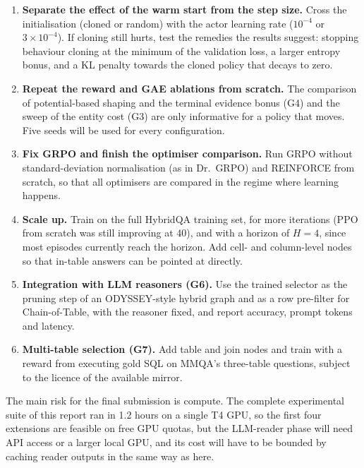 \begin{enumerate}
  \item \textbf{Separate the effect of the warm start from the step size.} Cross the initialisation (cloned or random) with the actor learning rate ($10^{-4}$ or $3\times10^{-4}$). If cloning still hurts, test the remedies the results suggest: stopping behaviour cloning at the minimum of the validation loss, a larger entropy bonus, and a KL penalty towards the cloned policy that decays to zero.
  \item \textbf{Repeat the reward and GAE ablations from scratch.} The comparison of potential-based shaping and the terminal evidence bonus (G4) and the sweep of the entity cost (G3) are only informative for a policy that moves. Five seeds will be used for every configuration.
  \item \textbf{Fix GRPO and finish the optimiser comparison.} Run GRPO without standard-deviation normalisation (as in Dr.~GRPO) and REINFORCE from scratch, so that all optimisers are compared in the regime where learning happens.
  \item \textbf{Scale up.} Train on the full HybridQA training set, for more iterations (PPO from scratch was still improving at 40), and with a horizon of $H=4$, since most episodes currently reach the horizon. Add cell- and column-level nodes so that in-table answers can be pointed at directly.
  \item \textbf{Integration with LLM reasoners (G6).} Use the trained selector as the pruning step of an ODYSSEY-style hybrid graph and as a row pre-filter for Chain-of-Table, with the reasoner fixed, and report accuracy, prompt tokens and latency.
  \item \textbf{Multi-table selection (G7).} Add table and join nodes and train with a reward from executing gold SQL on MMQA's three-table questions, subject to the licence of the available mirror.
\end{enumerate}

The main risk for the final submission is compute. The complete experimental suite of this report ran in 1.2 hours on a single T4 GPU, so the first four extensions are feasible on free GPU quotas, but the LLM-reader phase will need API access or a larger local GPU, and its cost will have to be bounded by caching reader outputs in the same way as here.
